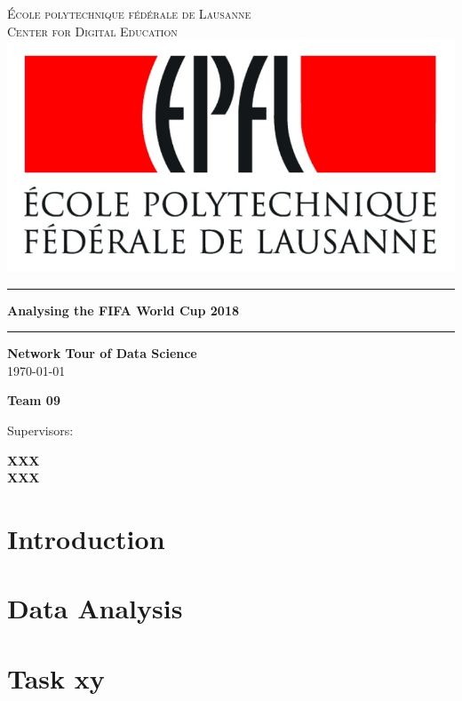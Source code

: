 \documentclass[12pt,a4paper, twocolumn]{article}
\begin{document}
\begin{titlepage}
	\centering
	 \textsc{\'Ecole polytechnique f\'ed\'erale de Lausanne}\\
	 \textsc{Center for Digital Education}\\
	\vspace{2.5cm}
	\includegraphics[scale=0.3]{Logo}\par
	\vspace{20pt}
	\hrule
	\vspace{5pt}
	{\LARGE\bfseries Analysing the FIFA World Cup 2018\par}
	\vspace{5pt}
	\hrule
	\vspace{10pt}
	
	\large \textbf{Network Tour of Data Science}\\
	\monthyeardate \today\par

	\vfill
	{\Large \textbf{Team 09}\par}

	\vspace{2cm}

	Supervisors:\par
	\textbf{XXX} \\
	\textbf{XXX} 
\end{titlepage}

\section{Introduction}

\section{Data Analysis}

\section{Task xy}
\end{document}

